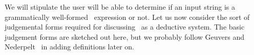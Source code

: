 \begin{node}\label{sml-0004}%
We will stipulate the user will be able to determine if an input string
is a grammatically well-formed \SML\ expression or not. Let us now
consider the sort of judgemental forms required for discussing \SML\ as
a deductive system. The basic judgement forms are sketched out here, but
we probably follow Geuvers and Nederpelt~\cite{nederpelt2014type} in
adding definitions later on.
\end{node}
